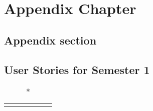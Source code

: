 \appendix
\chapter{Appendix Chapter}

\section{Appendix section}
\section{User Stories for Semester 1}
\begin{longtable}[h!]{|p{1cm}|p{8.6cm}|p{1cm}|p{1.2cm}|p{1.2cm}|p{1.3cm}|}
    \caption*{}
    \centering
    

\end{longtable}
